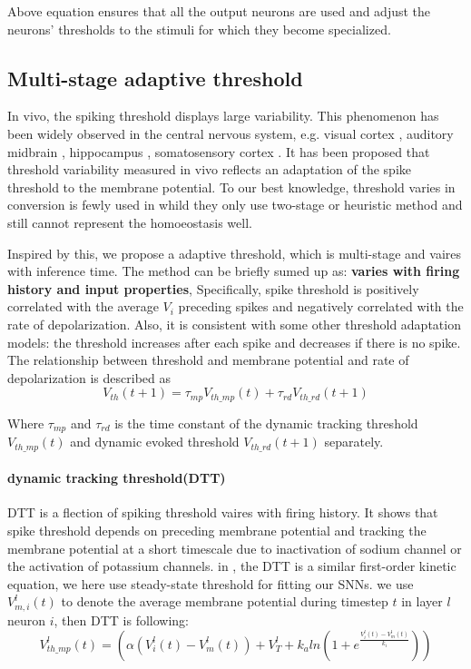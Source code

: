 \documentclass{article}
\begin{document}
Above equation ensures that all the output neurons are used and adjust the neurons' thresholds to the stimuli for which they become specialized. 

\subsection{Multi-stage adaptive threshold}

In vivo, the spiking threshold displays large variability. This phenomenon has been widely observed in
the central nervous system, e.g. visual cortex \cite{azouz2000dynamic, azouz2003adaptive}, auditory
midbrain \cite{pena2002postsynaptic}, hippocampus \cite{henze2001action}, somatosensory cortex \cite{wilent2005stimulus}. It has
been proposed that threshold variability measured in vivo reflects
an adaptation of the spike threshold to the membrane potential. To our best knowledge, threshold varies in conversion is fewly used in \cite{kim2020towards,chen2022adaptive,li2021free} whild they only use two-stage or heuristic method and still cannot represent the homoeostasis well.

Inspired by this, we propose a adaptive threshold, which is multi-stage and vaires with inference time.
The method can be briefly sumed up as: \textbf{varies with firing history and input properties},
Specifically, spike threshold is positively correlated with the average $V_i$ preceding spikes and negatively correlated with the rate of depolarization. Also, it is consistent with some
other threshold adaptation models: the threshold increases after each spike and decreases if there is no spike.
The relationship between threshold and membrane potential and rate of depolarization is described as
\begin{equation}
  V_{th}(t+1) = \tau_{mp}V_{th\_mp}(t) + \tau_{rd}V_{th\_rd}(t+1)
\end{equation}

Where $\tau_{mp}$ and $\tau_{rd}$ is the time constant of the dynamic tracking threshold $V_{th\_mp}(t)$ and dynamic evoked threshold $V_{th\_rd}(t+1)$ separately.

\paragraph{dynamic tracking threshold(DTT)} DTT is a flection of spiking threshold vaires with firing history. It shows that spike threshold depends on preceding membrane potential
and tracking the membrane potential at a short timescale due to inactivation of sodium channel\cite{kuba2010presynaptic, hu2009distinct, platkiewicz2011impact} or the activation of potassium channels\cite{higgs2011kv1, goldberg2008k}.
in \cite{fontaine2014spike}, the DTT is a similar first-order kinetic equation, we here use steady-state threshold for fitting our SNNs.
we use $V_{m,i}^l(t)$ to denote the average membrane potential during timestep $t$ in layer $l$ neuron $i$, then DTT is following:
\begin{equation}
  V_{th\_mp}^l(t) = \left(\alpha\left(V_i^l(t)-V_m^l(t)\right)+V_{T}^l+k_aln\left(1+e^{\frac{V_i^l(t)-V_m^l(t)}{k_i}}\right)\right)
\end{equation}
\end{document}
